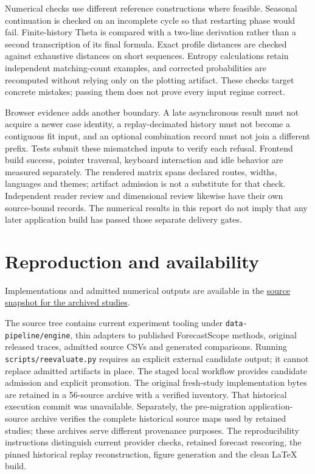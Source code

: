 \documentclass[11pt,a4paper]{article}
\begin{document}
Numerical checks use different reference constructions where feasible. Seasonal continuation is checked on an incomplete cycle so that restarting phase would fail. Finite-history Theta is compared with a two-line derivation rather than a second transcription of its final formula. Exact profile distances are checked against exhaustive distances on short sequences. Entropy calculations retain independent matching-count examples, and corrected probabilities are recomputed without relying only on the plotting artifact. These checks target concrete mistakes; passing them does not prove every input regime correct.

Browser evidence adds another boundary. A late asynchronous result must not acquire a newer case identity, a replay-decimated history must not become a contiguous fit input, and an optional combination record must not join a different prefix. Tests submit these mismatched inputs to verify each refusal. Frontend build success, pointer traversal, keyboard interaction and idle behavior are measured separately. The rendered matrix spans declared routes, widths, languages and themes; artifact admission is not a substitute for that check. Independent reader review and dimensional review likewise have their own source-bound records. The numerical results in this report do not imply that any later application build has passed those separate delivery gates.



\section{Reproduction and availability}
Implementations and admitted numerical outputs are available in the \href{https://github.com/fsantibanezleal/CAOS_RES_ChronoScope/tree/20fa9357716b534c4fdd3a5aa66cacd9eb66e416}{source snapshot for the archived studies}.

The source tree contains current experiment tooling under \texttt{data-pipeline/engine}, thin adapters to published ForecastScope methods, original released traces, admitted source CSVs and generated comparisons. Running \texttt{scripts/reevaluate.py} requires an explicit external candidate output; it cannot replace admitted artifacts in place. The staged local workflow provides candidate admission and explicit promotion. The original fresh-study implementation bytes are retained in a 56-source archive with a verified inventory. That historical execution commit was unavailable. Separately, the pre-migration application-source archive verifies the complete historical source maps used by retained studies; these archives serve different provenance purposes. The reproducibility instructions distinguish current provider checks, retained forecast rescoring, the pinned historical replay reconstruction, figure generation and the clean LaTeX build.
\end{document}

